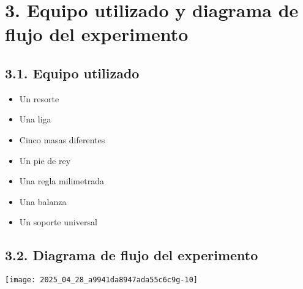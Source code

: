 \section{3. Equipo utilizado y diagrama de flujo del experimento}
\subsection{3.1. Equipo utilizado}
\begin{itemize}
  \item Un resorte
  \item Una liga
  \item Cinco masas diferentes
  \item Un pie de rey
  \item Una regla milimetrada
  \item Una balanza
  \item Un soporte universal
\end{itemize}

\subsection{3.2. Diagrama de flujo del experimento}
\begin{center}
\texttt{[image: 2025\_04\_28\_a9941da8947ada55c6c9g-10]}
\end{center}
